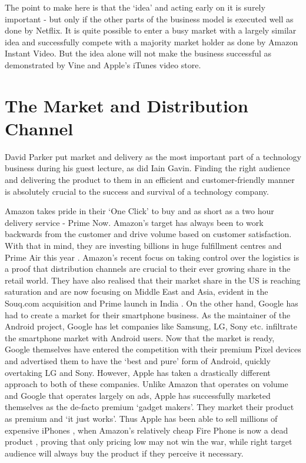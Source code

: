 \documentclass[twocolumn]{bmcart}%
\begin{document}
\par The point to make here is that the `idea' and acting early on it is surely important - but only if the other parts of the business model is executed well as done by Netflix. It is quite possible to enter a busy market with a largely similar idea and successfully compete with a majority market holder as done by Amazon Instant Video. But the idea alone will not make the business successful as demonstrated by Vine and Apple's iTunes video store.

\section*{The Market and Distribution Channel}
David Parker put market and delivery as the most important part of a technology business during his guest lecture, as did Iain Gavin. Finding the right audience and delivering the product to them in an efficient and customer-friendly manner is absolutely crucial to the success and survival of a technology company.\\

\par Amazon takes pride in their `One Click' to buy and as short as a two hour delivery service - Prime Now. Amazon's target has always been to work backwards from the customer and drive volume based on customer satisfaction. With that in mind, they are investing billions in huge fulfillment centres and Prime Air this year \cite{lesliehook2016}. Amazon's recent focus on taking control over the logistics is a proof that distribution channels are crucial to their ever growing share in the retail world. They have also realised that their market share in the US is reaching saturation and are now focusing on Middle East and Asia, evident in the Souq.com acquisition \cite{simeonkerr2017} and Prime launch in India \cite{simonmundy2016}. On the other hand, Google has had to create a market for their smartphone business. As the maintainer of the Android project, Google has let companies like Samsung, LG, Sony etc. infiltrate the smartphone market with Android users. Now that the market is ready, Google themselves have entered the competition with their premium Pixel devices and advertised them to have the `best and pure' form of Android, quickly overtaking LG and Sony. However, Apple has taken a drastically different approach to both of these companies. Unlike Amazon that operates on volume and Google that operates largely on ads, Apple has successfully marketed themselves as the de-facto premium `gadget makers'. They market their product as premium and `it just works'. Thus Apple has been able to sell millions of expensive iPhones \cite{tessstynes2015}, when Amazon's relatively cheap Fire Phone is now a dead product \cite{jacobkastrenakes2015}, proving that only pricing low may not win the war, while right target audience will always buy the product if they perceive it necessary.\\
\end{document}
